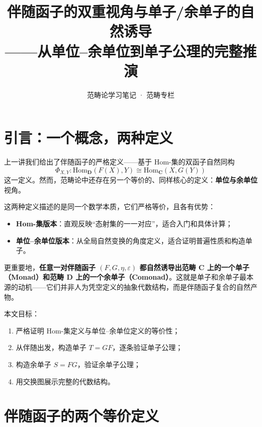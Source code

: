 \documentclass[12pt,a4paper]{ctexart}
\title{\textbf{伴随函子的双重视角与单子/余单子的自然诱导}\\[0.3em]
\large ——从单位--余单位到单子公理的完整推演}
\author{范畴论学习笔记 · 范畴专栏}
\date{}
\theoremstyle{definition}
\newcommand{\cat}[1]{\mathbf{#1}}
\newcommand{\Hom}{\mathrm{Hom}}
\begin{document}
\maketitle

\tableofcontents
\newpage

\section{引言：一个概念，两种定义}

上一讲我们给出了伴随函子的严格定义——基于 Hom-集的双函子自然同构
\[
\Phi_{X,Y}: \Hom_{\cat{D}}(F(X), Y) \cong \Hom_{\cat{C}}(X, G(Y))
\]
这一定义。然而，范畴论中还存在另一个等价的、同样核心的定义：\textbf{单位与余单位}视角。

这两种定义描述的是同一个数学本质，它们严格等价，且各有优势：
\begin{itemize}[nosep]
    \item \textbf{Hom-集版本}：直观反映“态射集的一一对应”，适合入门和具体计算；
    \item \textbf{单位--余单位版本}：从全局自然变换的角度定义，适合证明普遍性质和构造单子。
\end{itemize}

更重要地，\textbf{任意一对伴随函子 $(F, G, \eta, \varepsilon)$ 都自然诱导出范畴 $\cat{C}$ 上的一个单子（Monad）和范畴 $\cat{D}$ 上的一个余单子（Comonad）}。这就是单子和余单子最本源的动机——它们并非人为凭空定义的抽象代数结构，而是伴随函子复合的自然产物。

本文目标：
\begin{enumerate}[nosep]
    \item 严格证明 Hom-集定义与单位--余单位定义的等价性；
    \item 从伴随出发，构造单子 $T = GF$，逐条验证单子公理；
    \item 构造余单子 $S = FG$，验证余单子公理；
    \item 用交换图展示完整的代数结构。
\end{enumerate}

\newpage

\section{伴随函子的两个等价定义}
\end{document}
